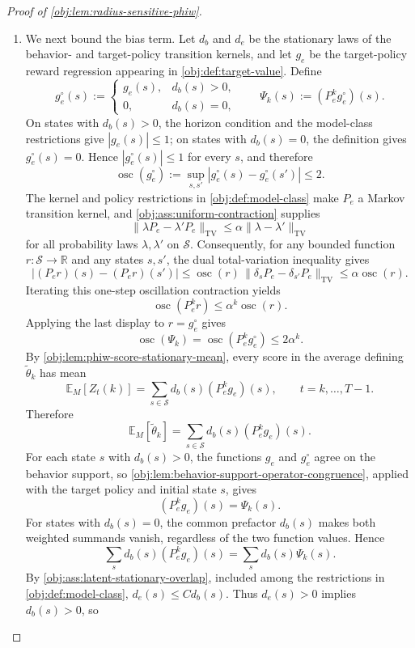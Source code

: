 \begin{proof}[Proof of \cref{obj:lem:radius-sensitive-phiw}]
\begin{enumerate}
\item
We next bound the bias term.  Let \(d_b\) and \(d_e\) be the stationary laws of the behavior- and target-policy transition kernels, and let \(g_e\) be the target-policy reward regression appearing in \cref{obj:def:target-value}.  Define
\[
g_e^\circ(s)
:=
\begin{cases}
g_e(s), & d_b(s)>0,\\
0, & d_b(s)=0,
\end{cases}
\qquad
\Psi_k(s):=(P_e^k g_e^\circ)(s).
\]
On states with \(d_b(s)>0\), the horizon condition and the model-class restrictions give \(|g_e(s)|\le 1\); on states with \(d_b(s)=0\), the definition gives \(g_e^\circ(s)=0\).  Hence \(|g_e^\circ(s)|\le 1\) for every \(s\), and therefore
\[
\operatorname{osc}(g_e^\circ)
:=
\sup_{s,s'} |g_e^\circ(s)-g_e^\circ(s')|
\le 2.
\]
The kernel and policy restrictions in \cref{obj:def:model-class} make \(P_e\) a Markov transition kernel, and \cref{obj:ass:uniform-contraction} supplies
\[
\|\lambda P_e-\lambda' P_e\|_{\mathrm{TV}}
\le
\alpha\|\lambda-\lambda'\|_{\mathrm{TV}}
\]
for all probability laws \(\lambda,\lambda'\) on \(\mathcal S\).  Consequently, for any bounded function \(r:\mathcal S\to\mathbb R\) and any states \(s,s'\), the dual total-variation inequality gives
\[
\bigl|(P_e r)(s)-(P_e r)(s')\bigr|
\le
\operatorname{osc}(r)\,\|\delta_sP_e-\delta_{s'}P_e\|_{\mathrm{TV}}
\le
\alpha\operatorname{osc}(r).
\]
Iterating this one-step oscillation contraction yields
\[
\operatorname{osc}(P_e^k r)
\le
\alpha^k\operatorname{osc}(r).
\]
Applying the last display to \(r=g_e^\circ\) gives
\[
\operatorname{osc}(\Psi_k)
=
\operatorname{osc}(P_e^k g_e^\circ)
\le
2\alpha^k .
\]
By \cref{obj:lem:phiw-score-stationary-mean}, every score in the average defining \(\widetilde\theta_k\) has mean
\[
\mathbb E_M[Z_t(k)]
=
\sum_{s\in\mathcal S} d_b(s)(P_e^k g_e)(s),
\qquad t=k,\ldots,T-1.
\]
Therefore
\[
\mathbb E_M[\widetilde\theta_k]
=
\sum_{s\in\mathcal S} d_b(s)(P_e^k g_e)(s).
\]
For each state \(s\) with \(d_b(s)>0\), the functions \(g_e\) and \(g_e^\circ\) agree on the behavior support, so \cref{obj:lem:behavior-support-operator-congruence}, applied with the target policy and initial state \(s\), gives
\[
(P_e^k g_e)(s)=\Psi_k(s).
\]
For states with \(d_b(s)=0\), the common prefactor \(d_b(s)\) makes both weighted summands vanish, regardless of the two function values.  Hence
\[
\sum_s d_b(s)(P_e^k g_e)(s)
=
\sum_s d_b(s)\Psi_k(s).
\]
By \cref{obj:ass:latent-stationary-overlap}, included among the restrictions in \cref{obj:def:model-class}, \(d_e(s)\le C d_b(s)\).  Thus \(d_e(s)>0\) implies \(d_b(s)>0\), so

\end{enumerate}
\end{proof}
